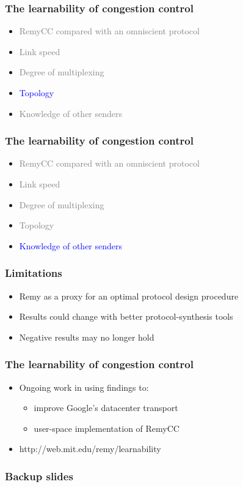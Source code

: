\documentclass[svgnames]{beamer}
\begin{document}
\begin{Large}


\begin{frame}
\frametitle{The learnability of congestion control}
\begin{itemize}
\item \textcolor{gray}{RemyCC compared with an omniscient protocol}
\item \textcolor{gray}{Link speed}
\item \textcolor{gray}{Degree of multiplexing}
\item \textcolor{blue}{Topology}
\item \textcolor{gray}{Knowledge of other senders}
\end{itemize}
\end{frame}

 

\begin{frame}
\frametitle{The learnability of congestion control}
\begin{itemize}
\item \textcolor{gray}{RemyCC compared with an omniscient protocol}
\item \textcolor{gray}{Link speed}
\item \textcolor{gray}{Degree of multiplexing}
\item \textcolor{gray}{Topology}
\item \textcolor{blue}{Knowledge of other senders}
\end{itemize}
\end{frame}



\begin{frame}
\frametitle{Limitations}
\begin{itemize}
\item<2-> Remy as a proxy for an optimal protocol design procedure
\item<3-> Results could change with better protocol-synthesis tools
\item<4-> Negative results may no longer hold
\end{itemize}
\end{frame}

\begin{frame}
\frametitle{The learnability of congestion control}
\noindent
\begin{itemize}
\item<1-> Ongoing work in using findings to:
\begin{itemize}
\item<2-> improve Google's datacenter transport
\item<3-> user-space implementation of RemyCC
\end{itemize}
\item<4-> http://web.mit.edu/remy/learnability
\end{itemize}
\end{frame}

\end{Large}

\begin{frame}
\frametitle{Backup slides}
\end{frame}







\end{document}
